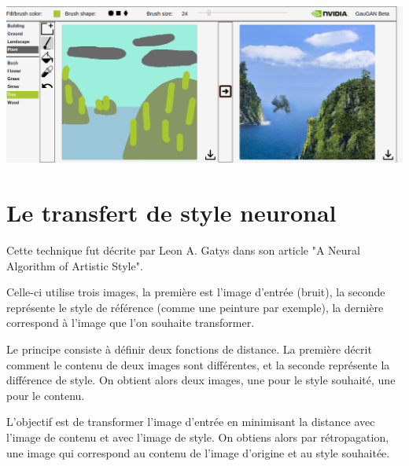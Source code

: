 \documentclass[a4paper, 12pt]{book}
\begin{document}
\includegraphics[width=1\linewidth]{images/test-gaugan.png}


\section{Le transfert de style neuronal}

Cette technique fut décrite par Leon A. Gatys dans son article "A Neural Algorithm of Artistic Style".~\cite{DBLP:journals/corr/GatysEB15a}

Celle-ci utilise trois images, la première est l'image d'entrée (bruit), la seconde représente le style de référence (comme une peinture par exemple), la dernière correspond à l'image que l'on souhaite transformer.

Le principe consiste à définir deux fonctions de distance. La première décrit comment le contenu de deux images sont différentes, et la seconde représente la différence de style. On obtient alors deux images, une pour le style souhaité, une pour le contenu.

L'objectif est de transformer l'image d'entrée en minimisant la distance avec l'image de contenu et avec l'image de style. On obtiens alors par rétropagation, une image qui correspond au contenu de l'image d'origine et au style souhaitée.
\end{document}
